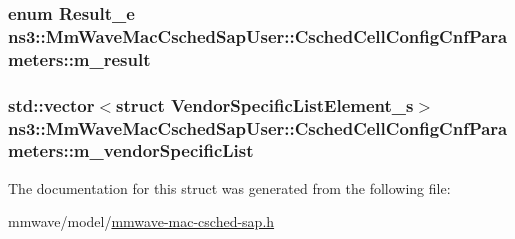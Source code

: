 \subsubsection[{\texorpdfstring{m\+\_\+result}{m_result}}]{\setlength{\rightskip}{0pt plus 5cm}enum {\bf Result\+\_\+e} ns3\+::\+Mm\+Wave\+Mac\+Csched\+Sap\+User\+::\+Csched\+Cell\+Config\+Cnf\+Parameters\+::m\+\_\+result}\hypertarget{structns3_1_1MmWaveMacCschedSapUser_1_1CschedCellConfigCnfParameters_a81720f7c439b29a6865d1817a8315e47}{}\label{structns3_1_1MmWaveMacCschedSapUser_1_1CschedCellConfigCnfParameters_a81720f7c439b29a6865d1817a8315e47}
\subsubsection[{\texorpdfstring{m\+\_\+vendor\+Specific\+List}{m_vendorSpecificList}}]{\setlength{\rightskip}{0pt plus 5cm}std\+::vector$<$struct {\bf Vendor\+Specific\+List\+Element\+\_\+s}$>$ ns3\+::\+Mm\+Wave\+Mac\+Csched\+Sap\+User\+::\+Csched\+Cell\+Config\+Cnf\+Parameters\+::m\+\_\+vendor\+Specific\+List}\hypertarget{structns3_1_1MmWaveMacCschedSapUser_1_1CschedCellConfigCnfParameters_afd6e6641ab009bc7c150da472e34d936}{}\label{structns3_1_1MmWaveMacCschedSapUser_1_1CschedCellConfigCnfParameters_afd6e6641ab009bc7c150da472e34d936}


The documentation for this struct was generated from the following file\+:\begin{DoxyCompactItemize}
\item 
mmwave/model/\hyperlink{mmwave-mac-csched-sap_8h}{mmwave-\/mac-\/csched-\/sap.\+h}\end{DoxyCompactItemize}
